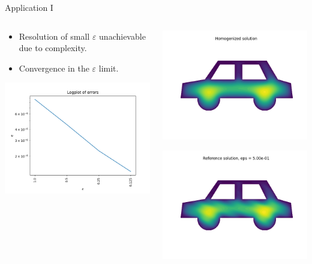 \documentclass{beamer}
\renewcommand{\epsilon}{\varepsilon}
\begin{document}
\begin{frame}[t]{Application I}
  \begin{columns}
    \begin{column}[c]{.5\textwidth}
      \begin{itemize}
      \item Resolution of small $\epsilon$ unachievable due to complexity.
      \item Convergence in the  $\epsilon$ limit.
      \end{itemize}
      \includegraphics[width=0.65\linewidth]{carw_errors.png}
  \end{column}
  \begin{column}[c]{.5\textwidth}

    \includegraphics[width=0.65\linewidth]{carw_homogenized.png}

    \includegraphics[width=0.65\linewidth]{carw_reference_eps_power_1.png}


\end{column}
\end{columns}
\end{frame}
\end{document}
